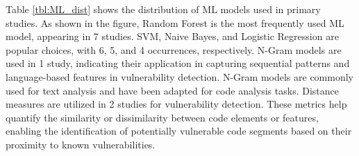 Table \ref{tbl:ML_dist} shows the distribution of ML models used in primary studies. As shown in the figure, Random Forest is the most frequently used ML model, appearing in 7 studies. SVM, Naive Bayes, and Logistic Regression are popular choices, with 6, 5, and 4 occurrences, respectively. N-Gram models are used in 1 study, indicating their application in capturing sequential patterns and language-based features in vulnerability detection. N-Gram models are commonly used for text analysis and have been adapted for code analysis tasks. Distance measures are utilized in 2 studies for vulnerability detection. These metrics help quantify the similarity or dissimilarity between code elements or features, enabling the identification of potentially vulnerable code segments based on their proximity to known vulnerabilities.







